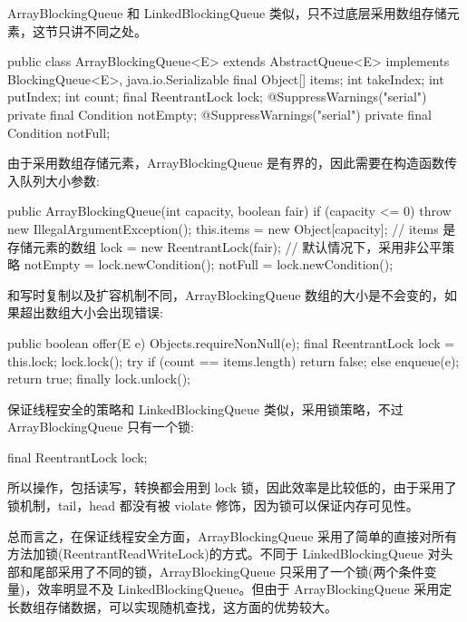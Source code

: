 ArrayBlockingQueue 和 LinkedBlockingQueue 类似，只不过底层采用数组存储元素，这节只讲不同之处。

\begin{Java}
public class ArrayBlockingQueue<E> extends AbstractQueue<E> implements BlockingQueue<E>, java.io.Serializable {
    final Object[] items;
    int takeIndex;
    int putIndex;
    int count;
    final ReentrantLock lock;
    @SuppressWarnings("serial")
    private final Condition notEmpty;
    @SuppressWarnings("serial")
    private final Condition notFull;
}
\end{Java}

由于采用数组存储元素，ArrayBlockingQueue 是有界的，因此需要在构造函数传入队列大小参数:

\begin{Java}
public ArrayBlockingQueue(int capacity, boolean fair) {
    if (capacity <= 0)
        throw new IllegalArgumentException();
    this.items = new Object[capacity];  // items 是存储元素的数组
    lock = new ReentrantLock(fair);     // 默认情况下，采用非公平策略
    notEmpty = lock.newCondition();
    notFull =  lock.newCondition();
}
\end{Java}

和写时复制以及扩容机制不同，ArrayBlockingQueue 数组的大小是不会变的，如果超出数组大小会出现错误:

\begin{Java}
public boolean offer(E e) {
    Objects.requireNonNull(e);
    final ReentrantLock lock = this.lock;
    lock.lock();
    try {
        if (count == items.length)
            return false;
        else {
            enqueue(e);
            return true;
        }
    } finally {
        lock.unlock();
    }
}
\end{Java}

保证线程安全的策略和 LinkedBlockingQueue 类似，采用锁策略，不过 ArrayBlockingQueue 只有一个锁:

\begin{Java}
final ReentrantLock lock;
\end{Java}

所以操作，包括读写，转换都会用到 lock 锁，因此效率是比较低的，由于采用了锁机制，tail，head 都没有被 violate 修饰，因为锁可以保证内存可见性。

总而言之，在保证线程安全方面，ArrayBlockingQueue 采用了简单的直接对所有方法加锁(ReentrantReadWriteLock)的方式。不同于 LinkedBlockingQueue 对头部和尾部采用了不同的锁，ArrayBlockingQueue 只采用了一个锁(两个条件变量)，效率明显不及 LinkedBlockingQueue。但由于 ArrayBlockingQueue 采用定长数组存储数据，可以实现随机查找，这方面的优势较大。

